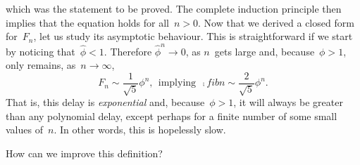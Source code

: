 which was the statement to be proved. The complete induction principle
then implies that the equation holds for all~\(n>0\). Now that we
derived a closed form for~\(F_n\), let us study its asymptotic
behaviour. This is straightforward if we start by noticing
that~\(\hat\phi < 1\). Therefore \(\hat\phi^n \rightarrow 0\), as
\(n\)~gets large and, because~\(\phi > 1\), only remains, as~\(n
\rightarrow \infty\),
\[
F_n \mathrel{\sim} \frac{1}{\sqrt{5}}\phi^n,\,\; \text{implying}
\,\; \comp{fib}{n} \mathrel{\sim} \frac{2}{\sqrt{5}}\phi^n.
\]
That is, this delay is \emph{exponential} and, because~\(\phi > 1\),
it will always be greater than any polynomial delay, except perhaps
for a finite number of some small values of~\(n\). In other words,
this is hopelessly slow.

How can we improve this definition?

